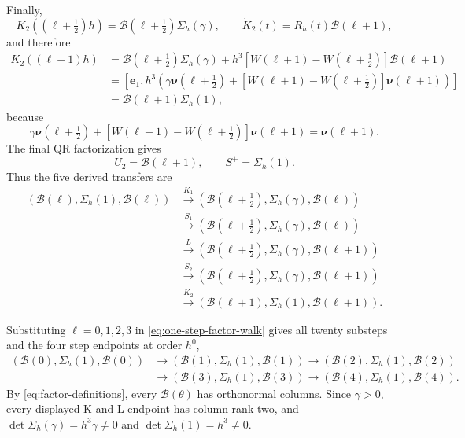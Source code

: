 \documentclass[]{article}
\numberwithin{equation}{section}
\theoremstyle{plain}
\theoremstyle{remark}
\begin{document}
Finally,
\[
 K_2((\ell+\tfrac12)h)=\mathcal B(\ell+\tfrac12)\Sigma_h(\gamma),
 \qquad \dot K_2(t)=R_h(t)\mathcal B(\ell+1),
\]
and therefore
\begin{align*}
 K_2((\ell+1)h)
 &=\mathcal B(\ell+\tfrac12)\Sigma_h(\gamma)+h^3
 [W(\ell+1)-W(\ell+\tfrac12)]\mathcal B(\ell+1)\\
 &=\left[\boldsymbol e_1,
 h^3\left(\gamma\boldsymbol\nu(\ell+\tfrac12)
 +[W(\ell+1)-W(\ell+\tfrac12)]\boldsymbol\nu(\ell+1)\right)\right]\\
 &=\mathcal B(\ell+1)\Sigma_h(1),
\end{align*}
because
\[
 \gamma\boldsymbol\nu(\ell+\tfrac12)+
 [W(\ell+1)-W(\ell+\tfrac12)]\boldsymbol\nu(\ell+1)
 =\boldsymbol\nu(\ell+1).
\]
The final QR factorization gives
\[
 U_2=\mathcal B(\ell+1),
 \qquad S^+=\Sigma_h(1).
\]
Thus the five derived transfers are
\begin{equation}\label{eq:one-step-factor-walk}
\begin{aligned}
 (\mathcal B(\ell),\Sigma_h(1),\mathcal B(\ell))
 &\xrightarrow{K_1}
 (\mathcal B(\ell+\tfrac12),\Sigma_h(\gamma),\mathcal B(\ell))\\
 &\xrightarrow{S_1}
 (\mathcal B(\ell+\tfrac12),\Sigma_h(\gamma),\mathcal B(\ell))\\
 &\xrightarrow{L}
 (\mathcal B(\ell+\tfrac12),\Sigma_h(\gamma),\mathcal B(\ell+1))\\
 &\xrightarrow{S_2}
 (\mathcal B(\ell+\tfrac12),\Sigma_h(\gamma),\mathcal B(\ell+1))\\
 &\xrightarrow{K_2}
 (\mathcal B(\ell+1),\Sigma_h(1),\mathcal B(\ell+1)).
\end{aligned}
\end{equation}

Substituting $\ell=0,1,2,3$ in
\eqref{eq:one-step-factor-walk} gives all twenty substeps and the four
step endpoints at order $h^0$,
\begin{equation}\label{eq:four-step-factor-chain}
\begin{aligned}
 (\mathcal B(0),\Sigma_h(1),\mathcal B(0))&\longrightarrow(\mathcal B(1),\Sigma_h(1),\mathcal B(1))
 \longrightarrow(\mathcal B(2),\Sigma_h(1),\mathcal B(2))\\
 &\longrightarrow(\mathcal B(3),\Sigma_h(1),\mathcal B(3))
 \longrightarrow(\mathcal B(4),\Sigma_h(1),\mathcal B(4)).
\end{aligned}
\end{equation}
By \eqref{eq:factor-definitions}, every $\mathcal B(\theta)$ has orthonormal columns.
Since $\gamma>0$, every displayed K and L endpoint has column rank two,
and $\det \Sigma_h(\gamma)=h^3\gamma\ne0$ and
$\det \Sigma_h(1)=h^3\ne0$.
\end{document}
